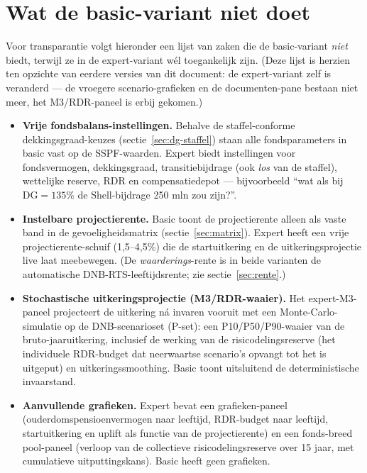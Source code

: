 \documentclass[11pt,a4paper]{article}
\newcommand{\dG}{\text{DG}}
\begin{document}
\section{Wat de basic-variant niet doet}
\label{sec:niet-in-basic}

Voor transparantie volgt hieronder een lijst van zaken die de basic-variant \emph{niet} biedt, terwijl ze in de expert-variant wél toegankelijk zijn. (Deze lijst is herzien ten opzichte van eerdere versies van dit document: de expert-variant zelf is veranderd --- de vroegere scenario-grafieken en de documenten-pane bestaan niet meer, het M3/RDR-paneel is erbij gekomen.)

\begin{itemize}

\item \textbf{Vrije fondsbalans-instellingen.} Behalve de staffel-conforme dekkingsgraad-keuzes (sectie~\ref{sec:dg-staffel}) staan alle fondsparameters in basic vast op de SSPF-waarden. Expert biedt instellingen voor fondsvermogen, dekkingsgraad, transitiebijdrage (ook \emph{los} van de staffel), wettelijke reserve, RDR en compensatiedepot --- bijvoorbeeld ``wat als bij $\dG = 135\%$ de Shell-bijdrage 250 mln zou zijn?''.

\item \textbf{Instelbare projectierente.} Basic toont de projectierente alleen als vaste band in de gevoeligheidsmatrix (sectie~\ref{sec:matrix}). Expert heeft een vrije projectierente-schuif (1,5--4,5\%) die de startuitkering en de uitkeringsprojectie live laat meebewegen. (De \emph{waarderings}-rente is in beide varianten de automatische DNB-RTS-leeftijdsrente; zie sectie~\ref{sec:rente}.)

\item \textbf{Stochastische uitkeringsprojectie (M3/RDR-waaier).} Het expert-M3-paneel projecteert de uitkering ná invaren vooruit met een Monte-Carlo-simulatie op de DNB-scenarioset (P-set): een P10/P50/P90-waaier van de bruto-jaaruitkering, inclusief de werking van de risicodelingsreserve (het individuele RDR-budget dat neerwaartse scenario's opvangt tot het is uitgeput) en uitkeringssmoothing. Basic toont uitsluitend de deterministische invaarstand.

\item \textbf{Aanvullende grafieken.} Expert bevat een grafieken-paneel (ouderdomspensioenvermogen naar leeftijd, RDR-budget naar leeftijd, startuitkering en uplift als functie van de projectierente) en een fonds-breed pool-paneel (verloop van de collectieve risicodelingsreserve over 15 jaar, met cumulatieve uitputtingskans). Basic heeft geen grafieken.


\end{itemize}
\end{document}
